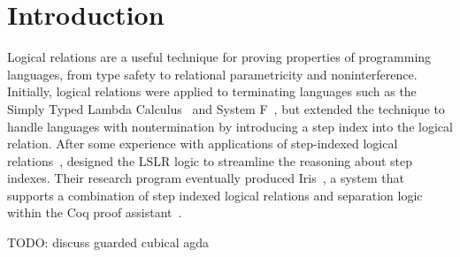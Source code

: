 \documentclass[acmsmall]{acmart}
\begin{document}



\maketitle


\clearpage

\tableofcontents

\section{Introduction}
\label{sec:intro}

Logical relations are a useful technique for proving properties of
programming languages, from type safety to relational parametricity
and noninterference.  Initially, logical relations were applied to
terminating languages such as the Simply Typed Lambda
Calculus~\citep{Tait:1967aa} and System F~\citep{GIRARD72}, but
\citet{Appel:2001aa} extended the technique to handle languages with
nontermination by introducing a step index into the logical
relation. After some experience with applications of step-indexed
logical
relations~\citep{Ahmed:2004eu,Ahmed:2009aa,Neis:2009fk,Hur:2011aa},
\citet{Dreyer:2011wl} designed the LSLR logic to streamline the
reasoning about step indexes. Their research program eventually
produced Iris~\citep{JUNG:2018aa}, a system that supports a
combination of step indexed logical relations and separation logic
within the Coq proof
assistant~\citep{The-Coq-Development-Team:2004kf,Huet:2016aa}.

TODO: discuss guarded cubical agda
\end{document}
